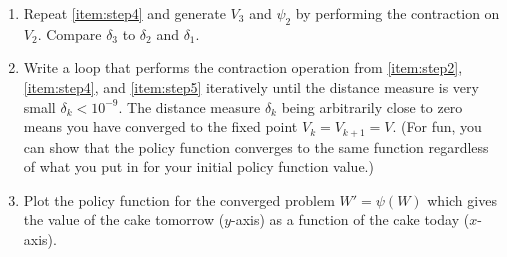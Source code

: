 \begin{problem}
\begin{enumerate}
\item \label{item:step5} Repeat \ref{item:step4} and generate $V_3$ and $\psi_2$ by performing the contraction on $V_2$. Compare $\delta_3$ to $\delta_2$ and $\delta_1$.

\item Write a loop that performs the contraction operation from \ref{item:step2}, \ref{item:step4}, and \ref{item:step5} iteratively until the distance measure is very small $\delta_k < 10^{-9}$.  The distance measure $\delta_k$ being arbitrarily close to zero means you have converged to the fixed point $V_k = V_{k+1} = V$. (For fun, you can show that the policy function converges to the same function regardless of what you put in for your initial policy function value.)

\item Plot the policy function for the converged problem $W' = \psi\left(W\right)$ which gives the value of the cake tomorrow ($y$-axis) as a function of the cake today ($x$-axis).
\end{enumerate}
\end{problem} 